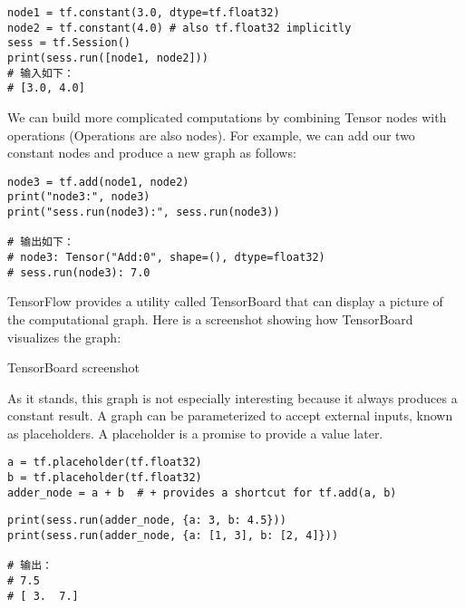 \begin{verbatim}
node1 = tf.constant(3.0, dtype=tf.float32)
node2 = tf.constant(4.0) # also tf.float32 implicitly
sess = tf.Session()
print(sess.run([node1, node2]))
# 输入如下：
# [3.0, 4.0]
\end{verbatim}

We can build more complicated computations by combining Tensor nodes with operations (Operations are also nodes). For example, we can add our two constant nodes and produce a new graph as follows:
\begin{verbatim}
node3 = tf.add(node1, node2)
print("node3:", node3)
print("sess.run(node3):", sess.run(node3))

# 输出如下：
# node3: Tensor("Add:0", shape=(), dtype=float32)
# sess.run(node3): 7.0
\end{verbatim}

TensorFlow provides a utility called TensorBoard that can display a picture of the computational graph. Here is a screenshot showing how TensorBoard visualizes the graph:

TensorBoard screenshot

As it stands, this graph is not especially interesting because it always produces a constant result. A graph can be parameterized to accept external inputs, known as placeholders. A placeholder is a promise to provide a value later.

\begin{verbatim}
a = tf.placeholder(tf.float32)
b = tf.placeholder(tf.float32)
adder_node = a + b  # + provides a shortcut for tf.add(a, b)
\end{verbatim}


\begin{verbatim}
print(sess.run(adder_node, {a: 3, b: 4.5}))
print(sess.run(adder_node, {a: [1, 3], b: [2, 4]}))

# 输出：
# 7.5
# [ 3.  7.]
\end{verbatim}

